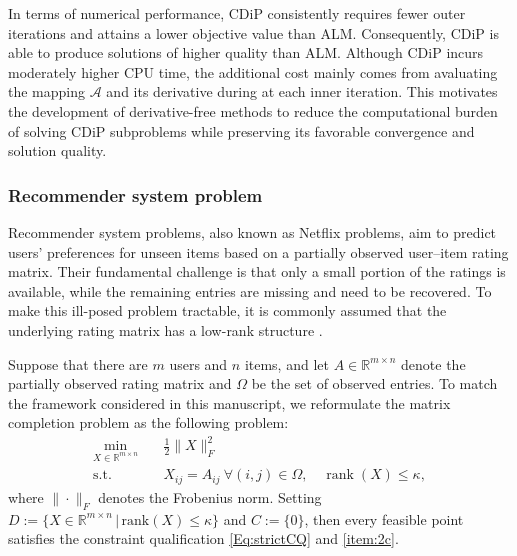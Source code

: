 \documentclass[11pt,a4paper,reqno]{amsart}
\begin{document}
{In terms of numerical performance, CDiP consistently requires fewer outer iterations and attains a lower objective value than ALM. Consequently, CDiP is able to produce solutions of higher quality than ALM. Although CDiP incurs moderately higher CPU time, the additional cost mainly comes from avaluating the mapping $\mathcal A$ and its derivative during at each inner iteration. This motivates the development of derivative-free methods to reduce the computational burden of solving CDiP subproblems while preserving its favorable convergence and solution quality.


\subsubsection{Recommender system problem}
\rm  Recommender system problems, also known as Netflix problems, aim to predict users' preferences for unseen items based on a partially observed user--item rating matrix. Their fundamental challenge is that only a small portion of the ratings is available, while the remaining entries are missing and need to be recovered. To make this ill-posed problem tractable, it is commonly assumed that the underlying rating matrix has a low-rank structure \cite[Section~1.3]{markovsky2012low}.

Suppose that there are $m$ users and $n$ items, and let $A\in\mathbb{R}^{m\times n}$ denote the partially observed rating matrix and $\Omega$ be the set of observed entries.
To match the framework considered in this manuscript, we reformulate the matrix completion problem as the following problem:
\begin{equation}\label{Eq:RecSys}
\begin{aligned}
    \min_{X\in\mathbb{R}^{m\times n}}\quad &
    \frac12\|X\|_F^2\\
    \text{s.t.}\quad &
    X_{ij}=A_{ij}\ \forall (i,j)\in\Omega, \quad \operatorname{rank}(X)\le \kappa,
\end{aligned}
\end{equation}
where $\|\cdot\|_F$ denotes the Frobenius norm. Setting $D:=\{X\in \mathbb R^{m \times n} \,|\, \text{rank} (X) \leq \kappa\}$ and $C:=\{0\}$, then every feasible point satisfies the constraint qualification \eqref{Eq:strictCQ} and  \ref{item:2c}. 

}
\end{document}
